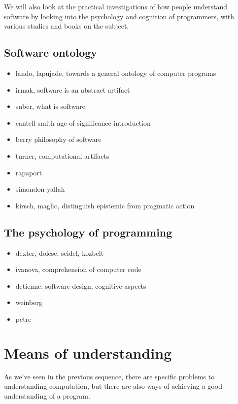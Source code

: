 We will also look at the practical investigations of how people understand software by looking into the psychology and cognition of programmers, with various studies and books on the subject.


\subsection{Software ontology}

\begin{itemize}
    \item lando, lapujade, towards a general ontology of computer programs
    \item irmak, software is an abstract artifact
    \item suber, what is software
    \item cantell smith age of significance introduction
    \item berry philosophy of software
    \item turner, computational artifacts
    \item rapaport
    \item simondon yallah
    \item kirsch, maglio, distinguish epistemic from pragmatic action
\end{itemize}

\subsection{The psychology of programming}

\begin{itemize}
    \item dexter, dolese, seidel, kozbelt
    \item ivanova, comprehension of computer code
    \item detienne: software design, cognitive aspects
    \item weinberg
    \item petre
\end{itemize}

\section{Means of understanding}

As we've seen in the previous sequence, there are specific problems to understanding computation, but there are also ways of achieving a good understanding of a program.

